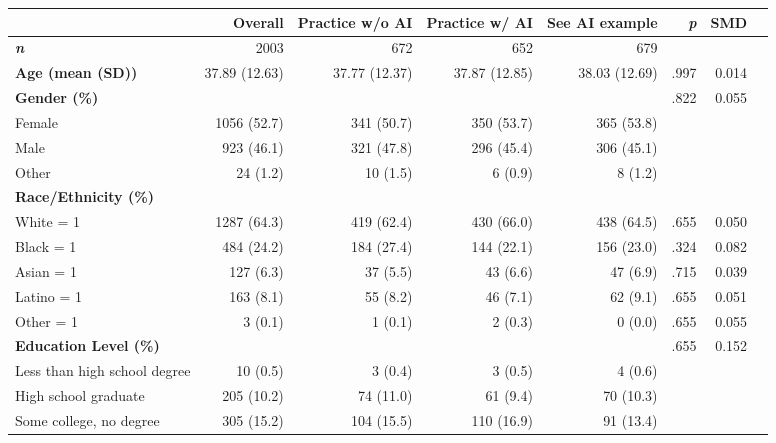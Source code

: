\documentclass[11pt]{report}
\begin{document}
\begin{append}
\begin{table}[h]
\begin{tabular}{lrrrrrrr}
\toprule
\multicolumn{1}{l}{} & Overall & Practice w/o AI & Practice w/ AI & See AI example & \textit{p} & SMD \\ 
\midrule
\textit{\textbf{n}} & 2003 & 672 & 652 & 679 &  &   \\ 
\textbf{Age (mean (SD))} & 37.89 (12.63) & 37.77 (12.37) & 37.87 (12.85) & 38.03 (12.69) & .997  &  0.014 \\ 
\textbf{Gender (\%)} &  &   &   &   & .822 &   0.055 \\ 
\hspace{1em}   Female & 1056 (52.7) & 341 (50.7) & 350 (53.7) & 365 (53.8) &  &  \\ 
\hspace{1em}   Male & 923 (46.1) & 321 (47.8) & 296 (45.4) & 306 (45.1) &  &  \\ 
\hspace{1em}   Other & 24 (1.2) & 10 (1.5) & 6 (0.9) & 8 (1.2) &  &  \\ 
\textbf{Race/Ethnicity (\%)} &  &   &   &   &  &  \\ 
\hspace{1em}White = 1 & 1287 (64.3) & 419 (62.4) & 430 (66.0) & 438 (64.5) & .655 & 0.050 \\ 
\hspace{1em}Black = 1 & 484 (24.2) & 184 (27.4) & 144 (22.1) & 156 (23.0) & .324 & 0.082 \\ 
\hspace{1em}Asian = 1 & 127 (6.3) & 37 (5.5) & 43 (6.6) & 47 (6.9) & .715 & 0.039 \\ 
\hspace{1em}Latino = 1 & 163 (8.1) & 55 (8.2) & 46 (7.1) & 62 (9.1) & .655 & 0.051 \\
\hspace{1em}Other = 1 & 3 (0.1) & 1 (0.1) & 2 (0.3) & 0 (0.0) & .655 & 0.055 \\ 
\textbf{Education Level (\%)} &  &   &   &   & .655 & 0.152 \\ 
\hspace{1em}Less than high school degree & 10 (0.5) & 3 (0.4) & 3 (0.5) & 4 (0.6) & &  \\ 
\hspace{1em}High school graduate & 205 (10.2) & 74 (11.0) & 61 (9.4) & 70 (10.3) & &  \\ 
\hspace{1em}Some college, no degree & 305 (15.2) & 104 (15.5) & 110 (16.9) & 91 (13.4) & &  \\ 

\end{tabular}
\end{table}
\end{append}
\end{document}
